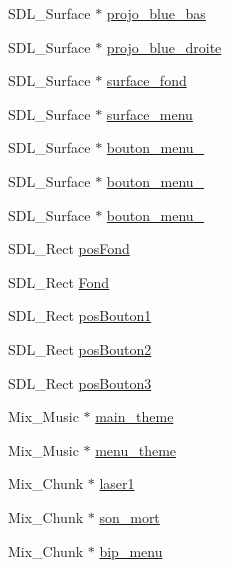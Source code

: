 \begin{DoxyCompactItemize}
\item 
S\-D\-L\-\_\-\-Surface $\ast$ \hyperlink{structsdl_jeu_a8798b282fc596b5711ba522d95ffb041}{projo\-\_\-blue\-\_\-bas}
\item 
S\-D\-L\-\_\-\-Surface $\ast$ \hyperlink{structsdl_jeu_af18510332136243335ab74b8f6876e1d}{projo\-\_\-blue\-\_\-droite}
\item 
S\-D\-L\-\_\-\-Surface $\ast$ \hyperlink{structsdl_jeu_af673014bd91e1e646926754799ab18d0}{surface\-\_\-fond}
\item 
S\-D\-L\-\_\-\-Surface $\ast$ \hyperlink{structsdl_jeu_a29c6542f0f27a5c7d75584b0332818b1}{surface\-\_\-menu}
\item 
S\-D\-L\-\_\-\-Surface $\ast$ \hyperlink{structsdl_jeu_a064aa3c5aa4bb35c72af2e7ec4af4722}{bouton\-\_\-menu\-\_}
\item 
S\-D\-L\-\_\-\-Surface $\ast$ \hyperlink{structsdl_jeu_a529025a491485aef1616d286edff9ae7}{bouton\-\_\-menu\-\_}
\item 
S\-D\-L\-\_\-\-Surface $\ast$ \hyperlink{structsdl_jeu_ad38d5f8cc0767da2a95b809b7ec5aa56}{bouton\-\_\-menu\-\_}
\item 
S\-D\-L\-\_\-\-Rect \hyperlink{structsdl_jeu_a1bb4e9da2e503d2e0c61d362a5e13234}{pos\-Fond}
\item 
S\-D\-L\-\_\-\-Rect \hyperlink{structsdl_jeu_a61a141b7f826f13b1a404bac31aabe4c}{Fond}
\item 
S\-D\-L\-\_\-\-Rect \hyperlink{structsdl_jeu_af6051c9f489b13415829103eab2689af}{pos\-Bouton1}
\item 
S\-D\-L\-\_\-\-Rect \hyperlink{structsdl_jeu_a23f4550911b88a484d4530c86026c191}{pos\-Bouton2}
\item 
S\-D\-L\-\_\-\-Rect \hyperlink{structsdl_jeu_a9e93c0144eeff3329f7a5ee934eca81d}{pos\-Bouton3}
\item 
Mix\-\_\-\-Music $\ast$ \hyperlink{structsdl_jeu_af7321948c26bf773e1bbee605d15c2d7}{main\-\_\-theme}
\item 
Mix\-\_\-\-Music $\ast$ \hyperlink{structsdl_jeu_af21ea3aee1c3c164e57edddad03634fe}{menu\-\_\-theme}
\item 
Mix\-\_\-\-Chunk $\ast$ \hyperlink{structsdl_jeu_ac3dc104264d31879f76daa8cb4c61bca}{laser1}
\item 
Mix\-\_\-\-Chunk $\ast$ \hyperlink{structsdl_jeu_a4dc97c9681105e31fd50f5cc1d4db7fa}{son\-\_\-mort}
\item 
Mix\-\_\-\-Chunk $\ast$ \hyperlink{structsdl_jeu_a58f8eda8c295fc531edf99fb867053a8}{bip\-\_\-menu}
\end{DoxyCompactItemize}


